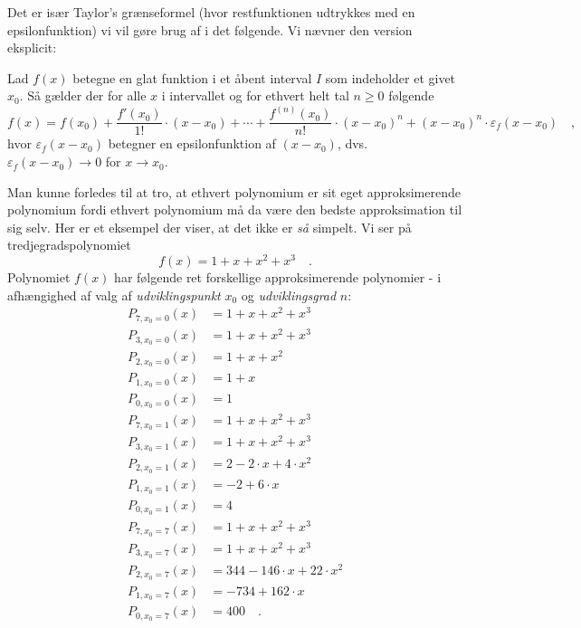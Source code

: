 Det er især Taylor's grænseformel (hvor restfunktionen udtrykkes med en epsilonfunktion) vi vil gøre brug af i det følgende. Vi nævner den version eksplicit:

\begin{theorem}
Lad $f(x)$ betegne en glat funktion i et åbent interval $I$ som indeholder et givet $x_{0}$.
Så gælder der for alle $x$ i intervallet og for ethvert helt tal $n \geq 0$ følgende
\begin{equation*}
f(x) = f(x_{0}) + \frac{f'(x_{0})}{1!}\cdot(x-x_{0}) + \cdots +
\frac{f^{(n)}(x_{0})}{n!}\cdot(x-x_{0})^{n} + (x-x_{0})^{n}\cdot\varepsilon_{f}(x-x_{0}) \quad ,
\end{equation*}
hvor $\varepsilon_{f}(x-x_{0})$ betegner en epsilonfunktion af $(x-x_{0})$, dvs. $\varepsilon_{f}(x-x_{0}) \to 0 $ for $x \to x_{0}$.
\end{theorem}

\begin{example} \label{exampPolyApproks}
Man kunne forledes til at tro, at ethvert polynomium er sit eget approksimerende polynomium fordi ethvert polynomium må da være den bedste approksimation til sig selv.
Her er et eksempel der viser, at det ikke er {\emph{så}} simpelt. Vi ser på tredjegradspolynomiet
\begin{equation}
f(x) = 1 + x + x^{2} + x^{3} \quad .
\end{equation}
Polynomiet $f(x)$ har følgende ret forskellige approksimerende polynomier - i afhængighed af valg af {\emph{udviklingspunkt}} $x_{0}$ og {\emph{udviklingsgrad}} $n$:
\begin{equation}
\begin{aligned}
P_{7, x_{0}=0}(x) &= 1 + x + x^{2} + x^{3} \\
P_{3, x_{0}=0}(x) &= 1 + x + x^{2} + x^{3} \\
P_{2, x_{0}=0}(x) &= 1 + x + x^{2}  \\
P_{1, x_{0}=0}(x) &= 1 + x   \\
P_{0, x_{0}=0}(x) &= 1  \\
P_{7, x_{0}=1}(x) &= 1 + x + x^{2} + x^{3} \\
P_{3, x_{0}=1}(x) &= 1 + x + x^{2} + x^{3} \\
P_{2, x_{0}=1}(x) &=  2 - 2\cdot x + 4\cdot x^{2}\\
P_{1, x_{0}=1}(x) &=  -2 + 6\cdot x\\
P_{0, x_{0}=1}(x) &= 4 \\
P_{7, x_{0}=7}(x) &= 1 + x + x^{2} + x^{3} \\
P_{3, x_{0}=7}(x) &= 1 + x + x^{2} + x^{3}\\
P_{2, x_{0}=7}(x) &= 344 - 146\cdot x + 22\cdot x^{2}\\
P_{1, x_{0}=7}(x) &= -734 + 162\cdot x\\
P_{0, x_{0}=7}(x) &= 400 \quad .
\end{aligned}
\end{equation}
\end{example}


